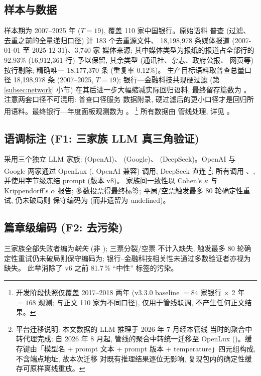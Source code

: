 \subsection{样本与数据}
样本期为 2007--2025 年 ($T=19$), 覆盖 110 家中国银行。原始语料
普查 (过滤、去重之前的全量递归口径) 计 183 个去重源文件、
18{,}198{,}978 条媒体报道 (2007-01-01 至 2025-12-31)、3{,}740 家
媒体来源; 其中媒体类型为报纸的报道占全部行的 92.93\%
(16{,}912{,}361 行) 予以保留, 其余类型 (通讯社、杂志、政府公报、
网页等) 按行剔除; 精确唯一 18{,}177{,}370 条 (重复率 0.12\%)。
生产目标语料取普查总量口径 18{,}198{,}978 条 (2007--2025,
$T=19$); 银行—金融科技共现硬过滤 (第 \ref{subsec:network} 小节)
在其后进一步大幅缩减实际回归语料, 最终留存篇数为
。注意两套口径不可混用: 普查口径服务
数据附录, 硬过滤后的更小口径才是回归所用语料。最终银行—年度面板观测数为
。%
\footnote{开发阶段快照仅覆盖 2017--2018 两年 (v3.3.0 baseline
$=84$ 家银行 $\times$ 2 年 $=168$ 观测; 与正文 110 家为不同口径),
仅用于管线联调, 不产生任何正文结果。}
所有数据由  管线处理, 详见
。

\subsection{语调标注 (F1: 三家族 LLM 真三角验证)}
采用三个独立 LLM 家族:  (OpenAI)、
 (Google)、
(DeepSeek)。OpenAI 与 Google 两家通过 OpenLux
(, OpenAI 兼容) 调用, DeepSeek 直连
\footnote{平台迁移说明: 本文数据的 LLM 推理于 2026 年 7 月经本管线
当时的聚合中转代理完成; 自 2026 年 8 月起, 管线的聚合中转统一迁移至
OpenLux ()。缓存键由「模型名 + prompt
文本 + prompt 版本 + temperature」四元组构成, 不含端点地址, 故本次迁移
对既有推理结果逐位无影响, 复现包内的确定性缓存可原样离线重放。}; 所有调用 、,
并使用字节级冻结 prompt (版本 v8)。
家族间一致性以 Cohen's $\kappa$ 与 Krippendorff's $\alpha$ 报告;
多数投票得最终标签; 平局/空票触发最多 80 轮确定性重试, 仍未破局则
保守编码为 (而非遗留为 undefined)。

\subsection{篇章级编码 (F2: 去污染)}
三家族全部失败者编为\emph{缺失} (非 ); 三票分裂/空票
不计入缺失, 触发最多 80 轮确定性重试仍未破局则保守编码为;
银行--金融科技相关性未通过多数验证者亦视为缺失。
此举消除了 v6 之前 81.7\,\% ``中性'' 标签的污染。

